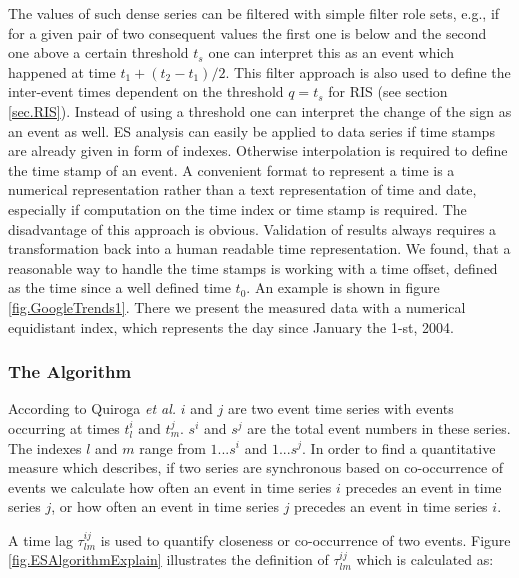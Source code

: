 \documentclass[a4paper,10pt]{scrbook}
\begin{document}
The values of such dense series can be filtered with simple filter role sets, e.g., if for a given pair of two consequent values the first one is below and the second one above a certain threshold $t_s$ one can interpret this as an event which happened at time $ t_1 + ( t_2 - t_1) / 2$. This filter approach is also used to define the inter-event times dependent on the threshold $q=t_s$ for RIS (see section \ref{sec.RIS}).  Instead of using a threshold one can interpret the change of the sign as an event as well. ES analysis can easily be applied to data series if time stamps are already given in form of indexes. Otherwise interpolation is required to define the time stamp of an event. A convenient format to represent a time is a numerical representation rather than a text representation of time and date, especially if computation on the time index or time stamp is required. The disadvantage of this approach is obvious. Validation of results always requires a transformation back into a human readable time representation. We found, that a reasonable way to handle the time stamps is working with a time offset, defined as the time since a well defined time $t_0$. An example is shown in figure \ref{fig.GoogleTrends1}. There we present the measured data with a numerical equidistant index, which represents the day since January the 1-st, 2004.

\subsubsection*{The Algorithm}
\label{sssec:ES_algorithm}

According to Quiroga \textit{et al.} $i$ and $j$ are two event time series with events occurring at times $t_l^i$ and $t_m^j$. $s^i$ and $s^j$ are the total event numbers in these series. The indexes $l$ and $m$ range from $1 ... s^i$ and 
$1 ... s^j$. In order to find a quantitative measure which describes, if two series are synchronous based on co-occurrence of events we calculate how often an event in time series $i$ precedes an event in time series $j$, or how often an event in time series $j$ precedes an event in time series $i$.

\label{ext.fig.ESAlgorithmExplain} 


A time lag $\tau_{lm}^{ij}$ is used to quantify closeness or co-occurrence of two events. Figure \ref{fig.ESAlgorithmExplain} illustrates the definition of $\tau_{lm}^{ij}$ which is calculated as:
\end{document}
